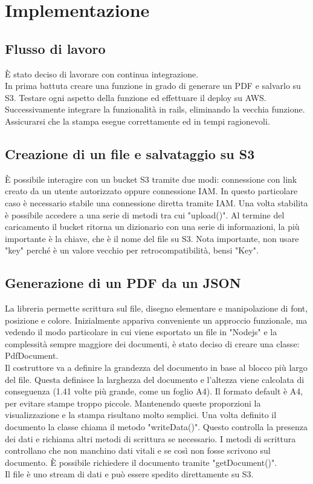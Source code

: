 \documentclass[12pt]{article}
\begin{document}
\section{Implementazione}
\subsection{Flusso di lavoro}
È stato deciso di lavorare con continua integrazione. 
\\ In prima battuta creare una funzione in grado di generare un PDF e salvarlo 
su S3. Testare ogni aspetto della funzione ed effettuare il deploy su AWS. 
\\ Successivamente integrare la funzionalità in rails, eliminando la vecchia 
funzione. Assicurarsi che la stampa esegue correttamente ed in tempi ragionevoli.

\subsection{Creazione di un file e salvataggio su S3}
È possibile interagire con un bucket S3 tramite due modi: connessione con link 
creato da un utente autorizzato oppure connessione IAM. In questo particolare 
caso è necessario stabile una connessione diretta tramite IAM. Una volta stabilita 
è possibile accedere a una serie di metodi tra cui "upload()". Al termine del 
caricamento il bucket ritorna un dizionario con una serie di informazioni, la 
più importante è la chiave, che è il nome del file su S3. Nota importante, 
non usare "key" perché è un valore vecchio per retrocompatibilità, bensi "Key". 

\subsection{Generazione di un PDF da un JSON}
La libreria permette scrittura sul file, disegno elementare e manipolazione di 
font, posizione e colore.
Inizialmente appariva conveniente un approccio funzionale, ma vedendo il modo 
particolare in cui viene esportato un file in "Nodejs" e la complessità sempre 
maggiore dei documenti, è stato deciso di creare una classe: PdfDocument. 
\\
Il costruttore va a definire la grandezza del documento in base al blocco più 
largo del file.
Questa definisce la larghezza del documento e l'altezza viene calcolata di
conseguenza (1.41 volte più grande, come un foglio A4).
Il formato default è A4, per evitare stampe troppo piccole.
Mantenendo queste proporzioni la visualizzazione e la stampa risultano molto 
semplici.
Una volta definito il documento la classe chiama il metodo "writeData()".
Questo controlla la presenza dei dati e richiama altri metodi di scrittura 
se necessario.
I metodi di scrittura controllano che non manchino dati vitali e se così non fosse 
scrivono sul documento. 
È possibile richiedere il documento tramite "getDocument()". 
\\ Il file è uno stream di dati e può essere spedito direttamente su S3. 
\end{document}
